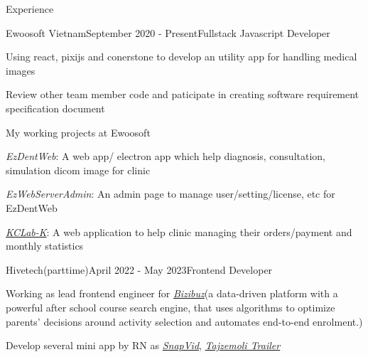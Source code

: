 \documentclass{resume}
\begin{document}
  \begin{rSection}{Experience}
    \begin{rSubsection}{Ewoosoft Vietnam}{September 2020 - Present}{Fullstack Javascript Developer}{}
      \item Using react, pixijs and conerstone to develop an utility app for handling medical images
      \item Review other team member code and paticipate in creating software requirement specification document 
    \end{rSubsection}

    \begin{rSubsection}{}{}{My working projects at Ewoosoft}{}
      \item {\emph{EzDentWeb}}: A web app/ electron app which help diagnosis, consultation, simulation dicom image for clinic
      \item {\emph{EzWebServerAdmin}}: An admin page to manage user/setting/license, etc for EzDentWeb
      \item \href{https://intro.kr.dentalcleverlab.com/}{\emph{KCLab-K}}: A web application to help clinic managing their orders/payment and monthly statistics
    \end{rSubsection}

    \newpage

    \begin{rSubsection}{Hivetech(parttime)}{April 2022 - May 2023}{Frontend Developer}{}
      \item Working as lead frontend engineer for \href{https://bizibuz.com/}{\emph{Bizibuz}}(a data-driven platform with a powerful after school course search engine, that uses algorithms to optimize parents’ decisions around activity selection and automates end-to-end enrolment.)
      \item Develop several mini app by RN as \href{https://apps.apple.com/us/app/pure-tubi-mp3-player/id1658133343}{\emph{SnapVid}}, \href{https://apps.apple.com/vn/app/id1617873009}{\emph{Tajzemoli Trailer}}
    \end{rSubsection}



\end{rSection}
\end{document}
